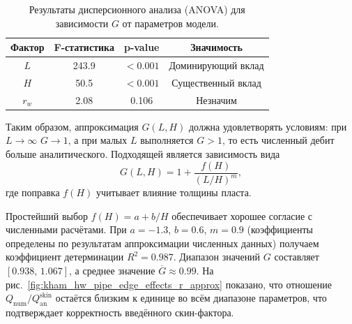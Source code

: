 \documentclass{article}
\begin{document}
\begin{table}[H]
	\centering
	\caption{Результаты дисперсионного анализа (ANOVA) для зависимости $G$ от параметров модели.}
	\begin{tabular}{|c|c|c|c|} %
		\hline %
		\textbf{Фактор} & \textbf{F-статистика} & \textbf{p-value} & \textbf{Значимость} \\
		\hline %
		$L$             & 243.9                 & $< 0.001$        & Доминирующий вклад  \\
		\hline %
		$H$             & 50.5                  & $< 0.001$        & Существенный вклад  \\
		\hline %
		$r_w$           & 2.08                  & 0.106            & Незначим            \\
		\hline %
	\end{tabular}
	\label{tab:anova_results}
\end{table}

Таким образом, аппроксимация $G(L,H)$ должна удовлетворять условиям:
при $L \to \infty$ $G \to 1$, а при малых $L$ выполняется $G > 1$,
то есть численный дебит больше аналитического. Подходящей является зависимость вида
\begin{equation}
	\displaystyle
	G \left(L, H \right) = 1 + \dfrac{f \left(H\right)}{\left(L/H\right)^m}, %
	\label{eq:kham_G_approx_common}
\end{equation}
где поправка $f(H)$ учитывает влияние толщины пласта.

Простейший выбор $f(H) = a + b/H$ обеспечивает хорошее согласие с численными расчётами.
При $a=-1.3$, $b=0.6$, $m=0.9$ (коэффициенты определены по результатам аппроксимации численных данных)
получаем коэффициент детерминации $R^2 = 0.987$.
Диапазон значений $G$ составляет $[0.938,\,1.067]$, а среднее значение $\overline{G} \approx 0.99$.
На рис.~\ref{fig:kham_hw_pipe_edge_effects_r_approx} показано, что отношение
$Q_{\text{num}}/Q_{\text{an}}^{\text{skin}}$ остаётся близким к единице во всём диапазоне параметров,
что подтверждает корректность введённого скин-фактора.
\end{document}
